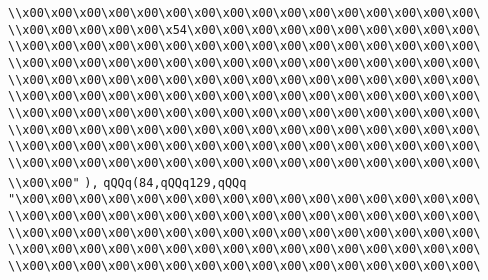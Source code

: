 \verb|\\x00\x00\x00\x00\x00\x00\x00\x00\x00\x00\x00\x00\x00\x00\x00\x00\|\newline
\verb|\\x00\x00\x00\x00\x00\x54\x00\x00\x00\x00\x00\x00\x00\x00\x00\x00\|\newline
\verb|\\x00\x00\x00\x00\x00\x00\x00\x00\x00\x00\x00\x00\x00\x00\x00\x00\|\newline
\verb|\\x00\x00\x00\x00\x00\x00\x00\x00\x00\x00\x00\x00\x00\x00\x00\x00\|\newline
\verb|\\x00\x00\x00\x00\x00\x00\x00\x00\x00\x00\x00\x00\x00\x00\x00\x00\|\newline
\verb|\\x00\x00\x00\x00\x00\x00\x00\x00\x00\x00\x00\x00\x00\x00\x00\x00\|\newline
\verb|\\x00\x00\x00\x00\x00\x00\x00\x00\x00\x00\x00\x00\x00\x00\x00\x00\|\newline
\verb|\\x00\x00\x00\x00\x00\x00\x00\x00\x00\x00\x00\x00\x00\x00\x00\x00\|\newline
\verb|\\x00\x00\x00\x00\x00\x00\x00\x00\x00\x00\x00\x00\x00\x00\x00\x00\|\newline
\verb|\\x00\x00\x00\x00\x00\x00\x00\x00\x00\x00\x00\x00\x00\x00\x00\x00\|\newline
\verb|\\x00\x00"|\newline
\verb|),|\newline
\verb|qQQq(84,qQQq129,qQQq|\newline
\verb|"\x00\x00\x00\x00\x00\x00\x00\x00\x00\x00\x00\x00\x00\x00\x00\x00\|\newline
\verb|\\x00\x00\x00\x00\x00\x00\x00\x00\x00\x00\x00\x00\x00\x00\x00\x00\|\newline
\verb|\\x00\x00\x00\x00\x00\x00\x00\x00\x00\x00\x00\x00\x00\x00\x00\x00\|\newline
\verb|\\x00\x00\x00\x00\x00\x00\x00\x00\x00\x00\x00\x00\x00\x00\x00\x00\|\newline
\verb|\\x00\x00\x00\x00\x00\x00\x00\x00\x00\x00\x00\x00\x00\x00\x00\x00\|\newline
